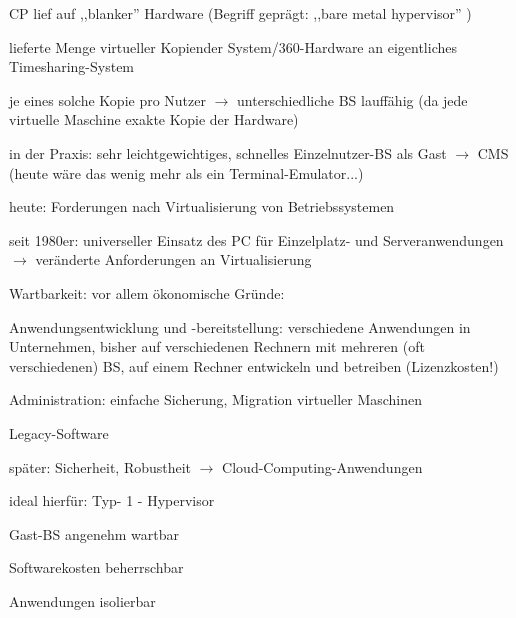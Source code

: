 \documentclass[a4paper]{article}
\newcommand{\cmark}{\ding{51}}
\begin{document}
\begin{multicols}{3}
\begin{itemize*}
\begin{itemize*}
            \item CP lief auf ,,blanker'' Hardware (Begriff geprägt: ,,bare metal hypervisor'' ) \begin{itemize*} \item lieferte Menge virtueller Kopiender System/360-Hardware an eigentliches Timesharing-System \item je eines solche Kopie pro Nutzer $\rightarrow$ unterschiedliche BS lauffähig (da jede virtuelle Maschine exakte Kopie der Hardware) \item in der Praxis: sehr leichtgewichtiges, schnelles Einzelnutzer-BS als Gast $\rightarrow$ CMS (heute wäre das wenig mehr als ein Terminal-Emulator...) \end{itemize*}
        \end{itemize*}
        \item
        heute: Forderungen nach Virtualisierung von Betriebssystemen
        \begin{itemize*}
            \item seit 1980er: universeller Einsatz des PC für Einzelplatz- und Serveranwendungen $\rightarrow$ veränderte Anforderungen an Virtualisierung
            \item Wartbarkeit: vor allem ökonomische Gründe: \begin{enumerate*} \item Anwendungsentwicklung und -bereitstellung: verschiedene Anwendungen in Unternehmen, bisher auf verschiedenen Rechnern mit mehreren (oft verschiedenen) BS, auf einem Rechner entwickeln und betreiben (Lizenzkosten!) \item Administration: einfache Sicherung, Migration virtueller Maschinen \item Legacy-Software \end{enumerate*}
            \item später: Sicherheit, Robustheit $\rightarrow$ Cloud-Computing-Anwendungen
        \end{itemize*}
        \item
        ideal hierfür: Typ- 1 - Hypervisor
        \begin{itemize*}
            \item \cmark Gast-BS angenehm wartbar
            \item \cmark Softwarekosten beherrschbar
            \item \cmark Anwendungen isolierbar
        \end{itemize*}
    \end{itemize*}


\end{multicols}
\end{document}
